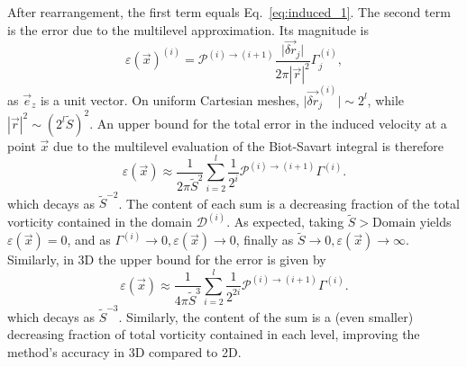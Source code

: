 \documentclass[final,1p,times]{elsarticle}
\begin{document}
After rearrangement, the first term equals Eq.~\eqref{eq:induced_1}. The second term is the error due to the multilevel approximation. Its magnitude is
\begin{equation}
    \varepsilon(\vec{x})^{(i)} = \mathcal{P}^{(i)\to(i+1)}\frac{\vert\vec{\delta r}_j\vert}{2\pi|\vec{r}|^2}\Gamma^{(i)}_j,
\end{equation}
as $\vec{e}_z$ is a unit vector. On uniform Cartesian meshes, $\vert\vec{\delta r}_j^{(i)}\vert\sim2^{l}$, while $|\vec{r}|^2 \sim (2^l\tilde{S})^2$. An upper bound for the total error in the induced velocity at a point $\vec x$ due to the multilevel evaluation of the Biot-Savart integral is therefore
\begin{equation}
    \varepsilon(\vec{x}) \approx \frac{1}{2\pi\tilde{S}^2}\sum_{i=2}^{l}\frac{1}{2^i}\mathcal{P}^{(i)\to(i+1)}
    \Gamma^{(i)}.
\end{equation}
which decays as $\tilde{S}^{-2}$. The content of each sum is a decreasing fraction of the total vorticity contained in the domain $\mathcal{D}^{(i)}$. As expected, taking $\tilde{S}>\text{Domain}$ yields $\varepsilon(\vec{x}) = 0$, and as $\Gamma^{(i)} \to 0, \varepsilon(\vec{x})\to 0$, finally as $\tilde{S}\to0, \varepsilon(\vec{x}) \to \infty$. Similarly, in 3D the upper bound for the error is given by
\begin{equation}
    \varepsilon(\vec{x}) \approx \frac{1}{4\pi\tilde{S}^3}\sum_{i=2}^{l}\frac{1}{2^{2i}}\mathcal{P}^{(i)\to(i+1)}
    \Gamma^{(i)}.
\end{equation}
which decays as $\tilde{S}^{-3}$. Similarly, the content of the sum is a (even smaller) decreasing fraction of total vorticity contained in each level, improving the method's accuracy in 3D compared to 2D.


\end{document}
